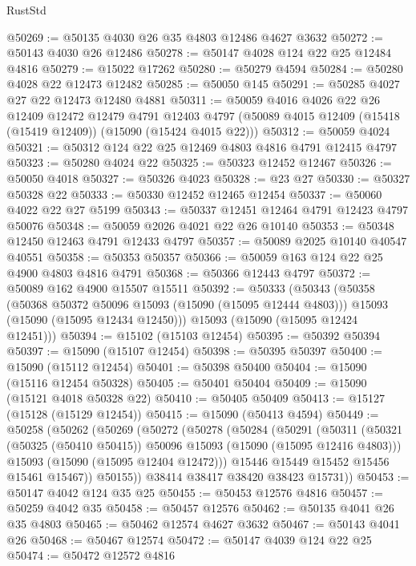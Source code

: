 \begin{lexlean}{RustStd}
\begin{coremodule}
@50269 := @50135 @4030 @26 @35 @4803 @12486 @4627 @3632
@50272 := @50143 @4030 @26 @12486
@50278 := @50147 @4028 @124 @22 @25 @12484 @4816
@50279 := @15022 @17262
@50280 := @50279 @4594
@50284 := @50280 @4028 @22 @12473 @12482
@50285 := @50050 @145
@50291 := @50285 @4027 @27 @22 @12473 @12480 @4881
@50311 := @50059
    @4016
    @4026
    @22
    @26
    @12409
    @12472
    @12479
    @4791
    @12403
    @4797
    (@50089 @4015 @12409 (@15418 (@15419 @12409)) (@15090 (@15424 @4015 @22)))
@50312 := @50059 @4024
@50321 := @50312 @124 @22 @25 @12469 @4803 @4816 @4791 @12415 @4797
@50323 := @50280 @4024 @22
@50325 := @50323 @12452 @12467
@50326 := @50050 @4018
@50327 := @50326 @4023
@50328 := @23 @27
@50330 := @50327 @50328 @22
@50333 := @50330 @12452 @12465 @12454
@50337 := @50060 @4022 @22 @27 @5199
@50343 := @50337 @12451 @12464 @4791 @12423 @4797 @50076
@50348 := @50059 @2026 @4021 @22 @26 @10140
@50353 := @50348 @12450 @12463 @4791 @12433 @4797
@50357 := @50089 @2025 @10140 @40547 @40551
@50358 := @50353 @50357
@50366 := @50059 @163 @124 @22 @25 @4900 @4803 @4816 @4791
@50368 := @50366 @12443 @4797
@50372 := @50089 @162 @4900 @15507 @15511
@50392 := @50333
    (@50343
      (@50358
        (@50368 @50372 @50096 @15093 (@15090 (@15095 @12444 @4803)))
        @15093
        (@15090 (@15095 @12434 @12450)))
      @15093
      (@15090 (@15095 @12424 @12451)))
@50394 := @15102 (@15103 @12454)
@50395 := @50392 @50394
@50397 := @15090 (@15107 @12454)
@50398 := @50395 @50397
@50400 := @15090 (@15112 @12454)
@50401 := @50398 @50400
@50404 := @15090 (@15116 @12454 @50328)
@50405 := @50401 @50404
@50409 := @15090 (@15121 @4018 @50328 @22)
@50410 := @50405 @50409
@50413 := @15127 (@15128 (@15129 @12454))
@50415 := @15090 (@50413 @4594)
@50449 := @50258
    (@50262
      (@50269
        (@50272
          (@50278
            (@50284
              (@50291
                (@50311
                  (@50321 (@50325 (@50410 @50415)) @50096 @15093 (@15090 (@15095 @12416 @4803)))
                  @15093
                  (@15090 (@15095 @12404 @12472)))
                @15446
                @15449
                @15452
                @15456
                @15461
                @15467))
            @50155))
        @38414
        @38417
        @38420
        @38423
        @15731))
@50453 := @50147 @4042 @124 @35 @25
@50455 := @50453 @12576 @4816
@50457 := @50259 @4042 @35
@50458 := @50457 @12576
@50462 := @50135 @4041 @26 @35 @4803
@50465 := @50462 @12574 @4627 @3632
@50467 := @50143 @4041 @26
@50468 := @50467 @12574
@50472 := @50147 @4039 @124 @22 @25
@50474 := @50472 @12572 @4816

\end{coremodule}
\end{lexlean}
